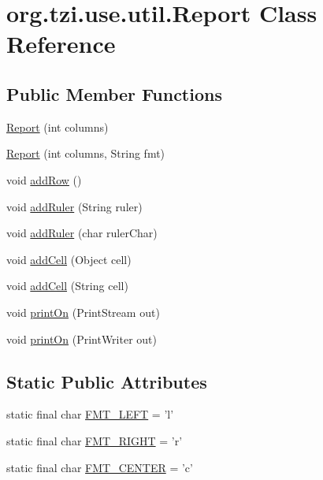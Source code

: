 \hypertarget{classorg_1_1tzi_1_1use_1_1util_1_1_report}{\section{org.\-tzi.\-use.\-util.\-Report Class Reference}
\label{classorg_1_1tzi_1_1use_1_1util_1_1_report}
}
\subsection*{Public Member Functions}
\begin{DoxyCompactItemize}
\item 
\hyperlink{classorg_1_1tzi_1_1use_1_1util_1_1_report_a517550a899eea16f2564cb4639b65905}{Report} (int columns)
\item 
\hyperlink{classorg_1_1tzi_1_1use_1_1util_1_1_report_a2dcd6941aeab7e0ec9bdaf303b5a3329}{Report} (int columns, String fmt)
\item 
void \hyperlink{classorg_1_1tzi_1_1use_1_1util_1_1_report_a312609eba16e7282a252eec586acb81e}{add\-Row} ()
\item 
void \hyperlink{classorg_1_1tzi_1_1use_1_1util_1_1_report_af12d14d0c7ceef2bab14c46b8a6ef478}{add\-Ruler} (String ruler)
\item 
void \hyperlink{classorg_1_1tzi_1_1use_1_1util_1_1_report_a2fbec2fed2d019a1708a5c62458b3d65}{add\-Ruler} (char ruler\-Char)
\item 
void \hyperlink{classorg_1_1tzi_1_1use_1_1util_1_1_report_a12350e526d569e86038fc7a6dc359d70}{add\-Cell} (Object cell)
\item 
void \hyperlink{classorg_1_1tzi_1_1use_1_1util_1_1_report_a85bb1a18151fefea8f24de17d02a7c79}{add\-Cell} (String cell)
\item 
void \hyperlink{classorg_1_1tzi_1_1use_1_1util_1_1_report_a15b50161c1b560f51dd142829989d1d5}{print\-On} (Print\-Stream out)
\item 
void \hyperlink{classorg_1_1tzi_1_1use_1_1util_1_1_report_ad5e73f01bef91ba72299915826d10eb0}{print\-On} (Print\-Writer out)
\end{DoxyCompactItemize}
\subsection*{Static Public Attributes}
\begin{DoxyCompactItemize}
\item 
static final char \hyperlink{classorg_1_1tzi_1_1use_1_1util_1_1_report_a0c45ec7214f1ffe3737e6a06c31be5a5}{F\-M\-T\-\_\-\-L\-E\-F\-T} = 'l'
\item 
static final char \hyperlink{classorg_1_1tzi_1_1use_1_1util_1_1_report_aaed0521416ca2651e24a0fcf146110b2}{F\-M\-T\-\_\-\-R\-I\-G\-H\-T} = 'r'
\item 
static final char \hyperlink{classorg_1_1tzi_1_1use_1_1util_1_1_report_ac47678cb5c85d6ca7bc6c03a1c77fea7}{F\-M\-T\-\_\-\-C\-E\-N\-T\-E\-R} = 'c'
\end{DoxyCompactItemize}


